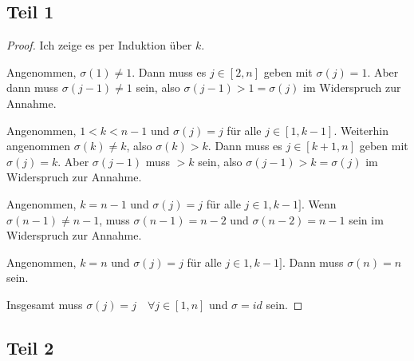 \documentclass[10pt,a4paper]{article}
\begin{document}
\subsection*{Teil 1}

\begin{proof}
Ich zeige es per Induktion über $k$.

Angenommen, $\sigma(1) \ne 1$.
Dann muss es $j \in [2, n]$ geben mit $\sigma(j) = 1$.
Aber dann muss $\sigma(j - 1) \ne 1$ sein, also $\sigma(j - 1) > 1 = \sigma(j)$ im Widerspruch zur Annahme.

Angenommen, $1 < k < n - 1$ und $\sigma(j) = j$ für alle $j \in [1, k - 1]$.
Weiterhin angenommen $\sigma(k) \ne k$, also $\sigma(k) > k$.
Dann muss es $j \in [k + 1, n]$ geben mit $\sigma(j) = k$.
Aber $\sigma(j - 1)$ muss $> k$ sein, also $\sigma(j - 1) > k = \sigma(j)$ im Widerspruch zur Annahme.

Angenommen, $k = n - 1$ und $\sigma(j) = j$ für alle $j \in 1, k - 1]$.
Wenn $\sigma(n - 1) \ne n - 1$, muss $\sigma(n - 1) = n - 2$ und $\sigma(n - 2) = n - 1$ sein im Widerspruch zur Annahme.

Angenommen, $k = n$ und $\sigma(j) = j$ für alle $j \in 1, k - 1]$.
Dann muss $\sigma(n) = n$ sein.

Insgesamt muss $\sigma(j) = j \quad \forall j \in [1, n]$ und $\sigma = id$ sein.
\end{proof}

\subsection*{Teil 2}
\end{document}

